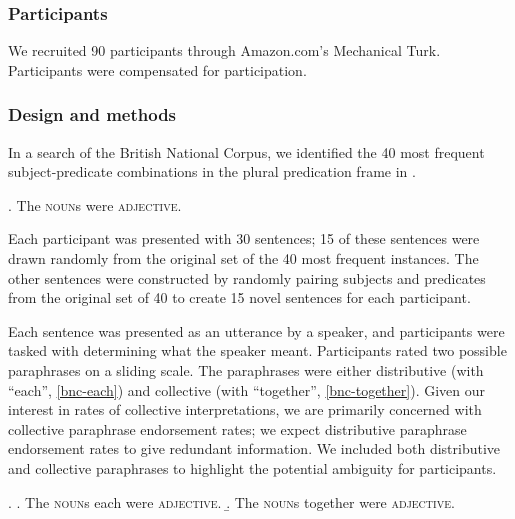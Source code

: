 \documentclass[linguex]{sp}
\newcommand{\ndg}[1]{\textcolor{Green}{[ndg: #1]}}
\newcommand{\gcs}[1]{\textcolor{blue}{[gcs: #1]}}
\begin{document}
\subsubsection{Participants}

We recruited 90 participants through Amazon.com's Mechanical Turk. Participants were compensated for participation.

\subsubsection{Design and methods}

In a search of the British National Corpus, we identified the 40 most frequent subject-predicate combinations in the plural predication frame in \Next.

\ex. The \textsc{noun}s were \textsc{adjective}.

Each participant was presented with 30 sentences; 15 of these sentences were drawn randomly 
from the original set of the 40 most frequent instances. The other sentences were constructed by randomly pairing subjects and predicates from the original set of 40 to create 15 novel sentences for each participant. 

Each sentence was presented as an utterance by a speaker, and participants were tasked with determining what the speaker meant. Participants rated two possible paraphrases on a sliding scale. The paraphrases were either distributive (with ``each'', \ref{bnc-each}) and collective (with ``together'', \ref{bnc-together}). Given our interest in rates of collective interpretations, we are primarily concerned with collective paraphrase endorsement rates; we expect distributive paraphrase endorsement rates to give redundant information.  We included both distributive and collective paraphrases to highlight the potential ambiguity for participants.

\ex. \a. The \textsc{noun}s each were \textsc{adjective}. \label{bnc-each}
\b. The \textsc{noun}s together were \textsc{adjective}. \label{bnc-together}
\end{document}

